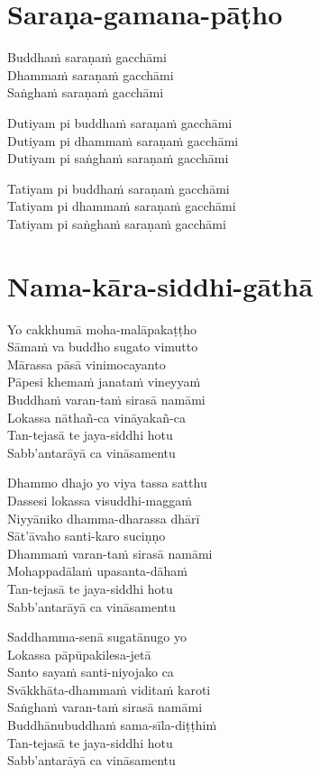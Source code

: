 \chapter{Saraṇa-gamana-pāṭho}


\begin{paritta}
Buddhaṁ saraṇaṁ gacchāmi\\
Dhammaṁ saraṇaṁ gacchāmi\\
Saṅghaṁ saraṇaṁ gacchāmi

Dutiyam pi buddhaṁ saraṇaṁ gacchāmi\\
Dutiyam pi dhammaṁ saraṇaṁ gacchāmi\\
Dutiyam pi saṅghaṁ saraṇaṁ gacchāmi

Tatiyam pi buddhaṁ saraṇaṁ gacchāmi\\
Tatiyam pi dhammaṁ saraṇaṁ gacchāmi\\
Tatiyam pi saṅghaṁ saraṇaṁ gacchāmi
\end{paritta}

\clearpage

\chapter{Nama-kāra-siddhi-gāthā}


\begin{paritta}
Yo cakkhumā moha-malāpakaṭṭho\\
Sāmaṁ va buddho sugato vimutto\\
Mārassa pāsā vinimocayanto\\
Pāpesi khemaṁ janataṁ vineyyaṁ\\
Buddhaṁ varan-taṁ sirasā namāmi\\
Lokassa nāthañ-ca vināyakañ-ca\\
Tan-tejasā te jaya-siddhi hotu\\
Sabb'antarāyā ca vināsamentu

Dhammo dhajo yo viya tassa satthu\\
Dassesi lokassa visuddhi-maggaṁ\\
Niyyāniko dhamma-dharassa dhārī\\
Sāt'āvaho santi-karo suciṇṇo\\
Dhammaṁ varan-taṁ sirasā namāmi\\
Mohappadālaṁ upasanta-dāhaṁ\\
Tan-tejasā te jaya-siddhi hotu\\
Sabb'antarāyā ca vināsamentu

Saddhamma-senā sugatānugo yo\\
Lokassa pāpūpakilesa-jetā\\
Santo sayaṁ santi-niyojako ca\\
Svākkhāta-dhammaṁ viditaṁ karoti\\
Saṅghaṁ varan-taṁ sirasā namāmi\\
Buddhānubuddhaṁ sama-sīla-diṭṭhiṁ\\
Tan-tejasā te jaya-siddhi hotu\\
Sabb'antarāyā ca vināsamentu
\end{paritta}

